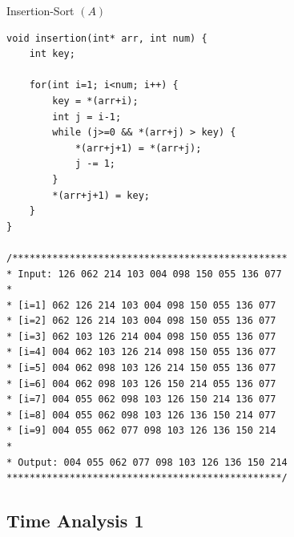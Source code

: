 \documentclass[12pt,openany]{book}
\theoremstyle{definition}
\begin{document}
	\begin{algorithm}[H]
		\caption{Insertion-Sort $(A)$}
		\BlankLine
		\BlankLine
	\end{algorithm}
	\begin{lstlisting}[style=C]
void insertion(int* arr, int num) {
	int key;
	
	for(int i=1; i<num; i++) {
		key = *(arr+i);
		int j = i-1;
		while (j>=0 && *(arr+j) > key) {
			*(arr+j+1) = *(arr+j);
			j -= 1;
		}
		*(arr+j+1) = key;
	}
}

/************************************************
* Input: 126 062 214 103 004 098 150 055 136 077 
* 
* [i=1] 062 126 214 103 004 098 150 055 136 077 
* [i=2] 062 126 214 103 004 098 150 055 136 077 
* [i=3] 062 103 126 214 004 098 150 055 136 077 
* [i=4] 004 062 103 126 214 098 150 055 136 077 
* [i=5] 004 062 098 103 126 214 150 055 136 077 
* [i=6] 004 062 098 103 126 150 214 055 136 077 
* [i=7] 004 055 062 098 103 126 150 214 136 077 
* [i=8] 004 055 062 098 103 126 136 150 214 077 
* [i=9] 004 055 062 077 098 103 126 136 150 214 
* 
* Output: 004 055 062 077 098 103 126 136 150 214 
************************************************/
	\end{lstlisting}
	
	\subsection{Time Analysis 1}
	\begin{figure}[h!]
		\centering
	\end{figure}
	
\end{document}
